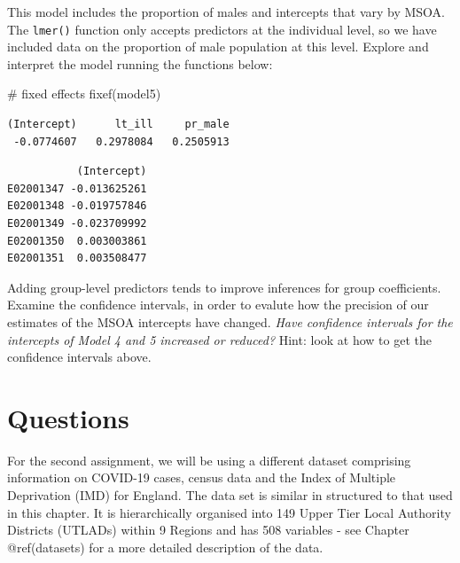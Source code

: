 \documentclass[
  letterpaper,
  DIV=11,
  numbers=noendperiod,
  oneside]{scrreprt}
\newenvironment{Shaded}{\begin{snugshade}}{\end{snugshade}}
\newcommand{\CommentTok}[1]{\textcolor[rgb]{0.37,0.37,0.37}{#1}}
\newcommand{\DecValTok}[1]{\textcolor[rgb]{0.68,0.00,0.00}{#1}}
\newcommand{\FunctionTok}[1]{\textcolor[rgb]{0.28,0.35,0.67}{#1}}
\newcommand{\NormalTok}[1]{\textcolor[rgb]{0.00,0.23,0.31}{#1}}
\newcommand{\OtherTok}[1]{\textcolor[rgb]{0.00,0.23,0.31}{#1}}
\newcommand{\SpecialCharTok}[1]{\textcolor[rgb]{0.37,0.37,0.37}{#1}}
\begin{document}
This model includes the proportion of males and intercepts that vary by
MSOA. The \texttt{lmer()} function only accepts predictors at the
individual level, so we have included data on the proportion of male
population at this level. Explore and interpret the model running the
functions below:

\begin{Shaded}
\begin{Highlighting}[]
\CommentTok{\# fixed effects}
\FunctionTok{fixef}\NormalTok{(model5)}
\end{Highlighting}
\end{Shaded}

\begin{verbatim}
(Intercept)      lt_ill     pr_male 
 -0.0774607   0.2978084   0.2505913 
\end{verbatim}

\begin{Shaded}
\end{Shaded}

\begin{verbatim}
           (Intercept)
E02001347 -0.013625261
E02001348 -0.019757846
E02001349 -0.023709992
E02001350  0.003003861
E02001351  0.003508477
\end{verbatim}

Adding group-level predictors tends to improve inferences for group
coefficients. Examine the confidence intervals, in order to evalute how
the precision of our estimates of the MSOA intercepts have changed.
\emph{Have confidence intervals for the intercepts of Model 4 and 5
increased or reduced?} Hint: look at how to get the confidence intervals
above.

\section{Questions}\label{questions-3}

For the second assignment, we will be using a different dataset
comprising information on COVID-19 cases, census data and the Index of
Multiple Deprivation (IMD) for England. The data set is similar in
structured to that used in this chapter. It is hierarchically organised
into 149 Upper Tier Local Authority Districts (UTLADs) within 9 Regions
and has 508 variables - see Chapter @ref(datasets) for a more detailed
description of the data.
\end{document}
